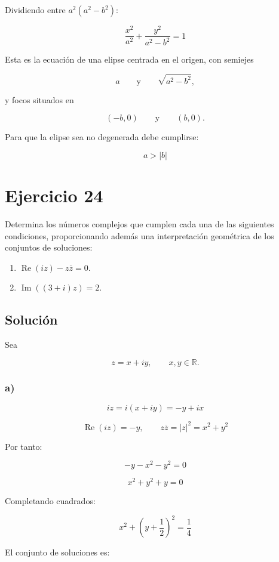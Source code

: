 \documentclass[fleqn]{article}
\begin{document}
		Dividiendo entre $a^2(a^2-b^2)$:

		\[
		\boxed{
		\frac{x^2}{a^2}
		+
		\frac{y^2}{a^2-b^2}
		=
		1
		}
		\]

		Esta es la ecuación de una elipse centrada en el origen, con semiejes

		\[
		a
		\qquad\text{y}\qquad
		\sqrt{a^2-b^2},
		\]

		y focos situados en

		\[
		(-b,0)
		\qquad\text{y}\qquad
		(b,0).
		\]

		Para que la elipse sea no degenerada debe cumplirse:

		\[
		\boxed{a>|b|}
		\]
	
	\section{Ejercicio 24}
		Determina los números complejos que cumplen cada una de las siguientes condiciones, proporcionando además una interpretación geométrica de los conjuntos de soluciones:

		\begin{enumerate}[label=\alph*)]
			\item $\operatorname{Re}(iz)-z\overline{z}=0$.
			\item $\operatorname{Im}\left((3+i)z\right)=2$.
		\end{enumerate}

		\subsection{Solución}

		Sea

		\[
		z=x+iy,
		\qquad x,y\in\mathbb{R}.
		\]

		\subsubsection*{a)}

		\[
		iz=i(x+iy)=-y+ix
		\]

		\[
		\operatorname{Re}(iz)=-y,
		\qquad
		z\overline{z}=|z|^2=x^2+y^2
		\]

		Por tanto:

		\[
		-y-x^2-y^2=0
		\]

		\[
		x^2+y^2+y=0
		\]

		Completando cuadrados:

		\[
		x^2+\left(y+\frac{1}{2}\right)^2
		=
		\frac{1}{4}
		\]

		El conjunto de soluciones es:
\end{document}
